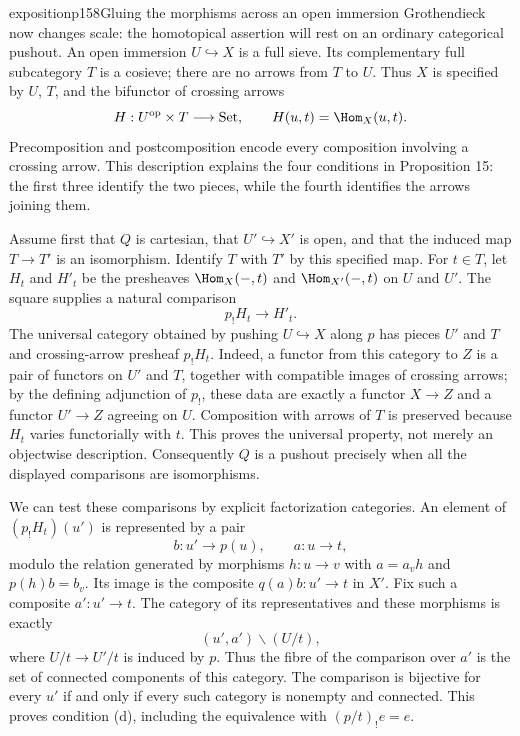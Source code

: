 \begin{dcomment}{exposition}{p158}{Gluing the morphisms across an open immersion}
Grothendieck now changes scale: the homotopical assertion will rest on an ordinary categorical pushout. An open immersion $U\hookrightarrow X$ is a full sieve. Its complementary full subcategory $T$ is a cosieve; there are no arrows from $T$ to $U$. Thus $X$ is specified by $U$, $T$, and the bifunctor of crossing arrows
\[
       H:U^{\mathrm{op}}\times T\longrightarrow\mathrm{Set},
       \qquad H(u,t)=\Hom_X(u,t).
\]
Precomposition and postcomposition encode every composition involving a crossing arrow. This description explains the four conditions in Proposition 15: the first three identify the two pieces, while the fourth identifies the arrows joining them.

Assume first that $Q$ is cartesian, that $U'\hookrightarrow X'$ is open, and that the induced map $T\to T'$ is an isomorphism. Identify $T$ with $T'$ by this specified map. For $t\in T$, let $H_t$ and $H'_t$ be the presheaves $\Hom_X(-,t)$ and $\Hom_{X'}(-,t)$ on $U$ and $U'$. The square supplies a natural comparison
\[
                  p_!H_t\longrightarrow H'_t.
\]
The universal category obtained by pushing $U\hookrightarrow X$ along $p$ has pieces $U'$ and $T$ and crossing-arrow presheaf $p_!H_t$. Indeed, a functor from this category to $Z$ is a pair of functors on $U'$ and $T$, together with compatible images of crossing arrows; by the defining adjunction of $p_!$, these data are exactly a functor $X\to Z$ and a functor $U'\to Z$ agreeing on $U$. Composition with arrows of $T$ is preserved because $H_t$ varies functorially with $t$. This proves the universal property, not merely an objectwise description. Consequently $Q$ is a pushout precisely when all the displayed comparisons are isomorphisms.

We can test these comparisons by explicit factorization categories. An element of $(p_!H_t)(u')$ is represented by a pair
\[
       b:u'\longrightarrow p(u),\qquad a:u\longrightarrow t,
\]
modulo the relation generated by morphisms $h:u\to v$ with $a=a_vh$ and $p(h)b=b_v$. Its image is the composite $q(a)b:u'\to t$ in $X'$. Fix such a composite $a':u'\to t$. The category of its representatives and these morphisms is exactly
\[
        (u',a')\backslash(U/t),
\]
where $U/t\to U'/t$ is induced by $p$. Thus the fibre of the comparison over $a'$ is the set of connected components of this category. The comparison is bijective for every $u'$ if and only if every such category is nonempty and connected. This proves condition (d), including the equivalence with $(p/t)_!e=e$.


\end{dcomment}
